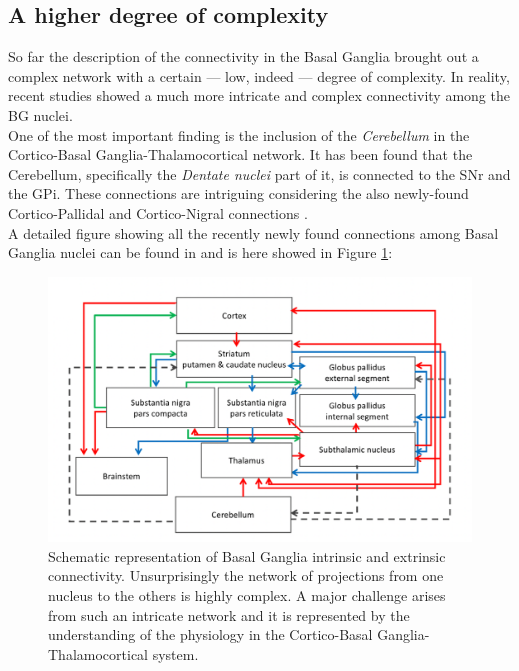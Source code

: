 \documentclass[MSc,english]{Container/thesistemplate}
\begin{document}
\newpage
\subsection*{A higher degree of complexity}
So far the description of the connectivity in the Basal Ganglia brought out a complex network with a certain --- low, indeed --- degree of complexity. In reality, recent studies showed a much more intricate and complex connectivity among the BG nuclei. 
\\ One of the most important finding is the inclusion of the \emph{Cerebellum} in the Cortico-Basal Ganglia-Thalamocortical network. It has been found that the Cerebellum, specifically the \emph{Dentate nuclei} part of it, is connected to the SNr and the GPi. These connections are intriguing considering the also newly-found Cortico-Pallidal and Cortico-Nigral connections \cite{milardi}.
\\ A detailed figure showing all the recently newly found connections among Basal Ganglia nuclei can be found in \cite{simonyan} and is here showed in Figure \ref{fig:network}:

\begin{figure}[ht!]
    \centering
    \includegraphics[scale=.75]{Images/network}
    \caption{Schematic representation of Basal Ganglia intrinsic and extrinsic connectivity. Unsurprisingly the network of projections from one nucleus to the others is highly complex. A major challenge arises from such an intricate network and it is represented by the understanding of the physiology in the Cortico-Basal Ganglia-Thalamocortical system.}
    \label{fig:network}
\end{figure}


\newpage
\end{document}
